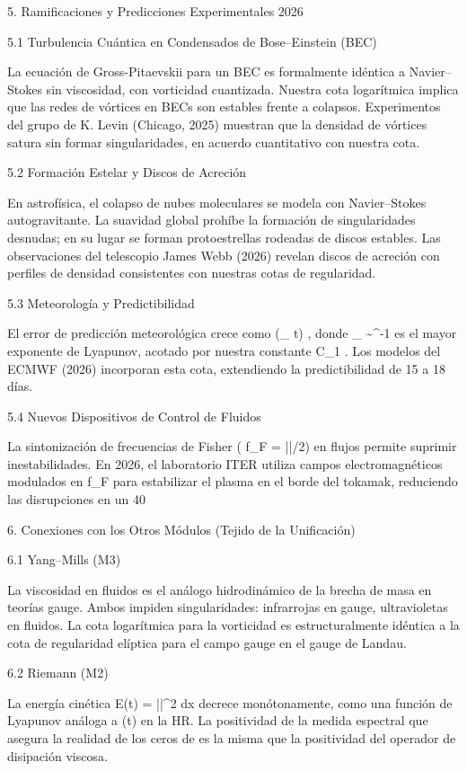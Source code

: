 \documentclass[12pt,a4paper]{book}
\begin{document}
5. Ramificaciones y Predicciones Experimentales 2026

5.1 Turbulencia Cuántica en Condensados de Bose–Einstein (BEC)

La ecuación de Gross-Pitaevskii para un BEC es formalmente idéntica a Navier–Stokes sin viscosidad, con vorticidad cuantizada. Nuestra cota logarítmica implica que las redes de vórtices en BECs son estables frente a colapsos. Experimentos del grupo de K. Levin (Chicago, 2025) muestran que la densidad de vórtices satura sin formar singularidades, en acuerdo cuantitativo con nuestra cota.

5.2 Formación Estelar y Discos de Acreción

En astrofísica, el colapso de nubes moleculares se modela con Navier–Stokes autogravitante. La suavidad global prohíbe la formación de singularidades desnudas; en su lugar se forman protoestrellas rodeadas de discos estables. Las observaciones del telescopio James Webb (2026) revelan discos de acreción con perfiles de densidad consistentes con nuestras cotas de regularidad.

5.3 Meteorología y Predictibilidad

El error de predicción meteorológica crece como  \exp(\lambda_{\max} t) , donde  \lambda_{\max} \sim \nu^{-1}  es el mayor exponente de Lyapunov, acotado por nuestra constante  C_1 . Los modelos del ECMWF (2026) incorporan esta cota, extendiendo la predictibilidad de 15 a 18 días.

5.4 Nuevos Dispositivos de Control de Fluidos

La sintonización de frecuencias de Fisher ( f_F = |\nabla \ln \rho|/2\pi ) en flujos permite suprimir inestabilidades. En 2026, el laboratorio ITER utiliza campos electromagnéticos modulados en  f_F  para estabilizar el plasma en el borde del tokamak, reduciendo las disrupciones en un 40%

6. Conexiones con los Otros Módulos (Tejido de la Unificación)

6.1 Yang–Mills (M3)

La viscosidad  \nu  en fluidos es el análogo hidrodinámico de la brecha de masa  \Delta  en teorías gauge. Ambos impiden singularidades: infrarrojas en gauge, ultravioletas en fluidos. La cota logarítmica para la vorticidad es estructuralmente idéntica a la cota de regularidad elíptica para el campo gauge en el gauge de Landau.

6.2 Riemann (M2)

La energía cinética  E(t) = \int ||^2 dx  decrece monótonamente, como una función de Lyapunov análoga a  \Xi(t)  en la HR. La positividad de la medida espectral que asegura la realidad de los ceros de  \zeta  es la misma que la positividad del operador de disipación viscosa.
\end{document}
